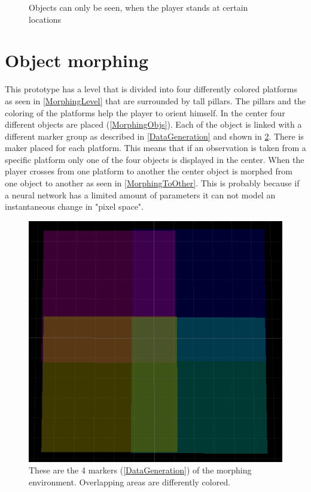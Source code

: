 \begin{figure}[p]
  \caption{Objects can only be seen, when the player stands at certain locations}
  \label{WalkingSim}
\end{figure}


\section{Object morphing}
This prototype has a level that is divided into four differently colored platforms as seen in \cref{MorphingLevel} that are surrounded by tall pillars. The pillars and the coloring of the platforms help the player to orient himself. In the center four different objects are placed (\cref{MorphingObjs}). Each of the object is linked with a different marker group as described in \cref{DataGeneration} and shown in \cref{MorphingMarkers}. There is maker placed for each platform. This means that if an observation is taken from a specific platform only one of the four objects is displayed in the center. When the player crosses from one platform to another the center object is morphed from one object to another as seen in \cref{MorphingToOther}. This is probably because if a neural network has a limited amount of parameters it can not model an instantaneous change in "pixel space".

\begin{figure}[p]
  \centering
  \includegraphics[width=\imgWidth]{images/workflow/object_morphing/CaptureAreas.png}
  \caption{These are the 4 markers (\cref{DataGeneration}) of the morphing environment. Overlapping areas are differently colored.}
  \label{MorphingMarkers}
\end{figure}


